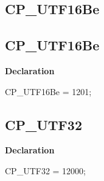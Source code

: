 \documentclass{report}
\newif\ifpdf
\begin{document}
\subsection*{\large{\textbf{CP{\_}UTF16Be}}\normalsize\hspace{1ex}\hrulefill}
\else
\subsection*{CP{\_}UTF16Be}
\fi
\label{PasDoc_Types-CP_UTF16Be}
\begin{list}{}{
\setlength{\itemindent}{0cm}
\setlength{\listparindent}{0cm}
\setlength{\leftmargin}{\evensidemargin}
\addtolength{\leftmargin}{\tmplength}
\settowidth{\labelsep}{X}
\addtolength{\leftmargin}{\labelsep}
\setlength{\labelwidth}{\tmplength}
}
\item[\textbf{Declaration}\hfill]
\ifpdf
\begin{flushleft}
\fi
\begin{ttfamily}
CP{\_}UTF16Be    = 1201;\end{ttfamily}

\ifpdf
\end{flushleft}
\fi

\end{list}
\ifpdf
\subsection*{\large{\textbf{CP{\_}UTF32}}\normalsize\hspace{1ex}\hrulefill}
\else
\subsection*{CP{\_}UTF32}
\fi
\label{PasDoc_Types-CP_UTF32}
\begin{list}{}{
\setlength{\itemindent}{0cm}
\setlength{\listparindent}{0cm}
\setlength{\leftmargin}{\evensidemargin}
\addtolength{\leftmargin}{\tmplength}
\settowidth{\labelsep}{X}
\addtolength{\leftmargin}{\labelsep}
\setlength{\labelwidth}{\tmplength}
}
\item[\textbf{Declaration}\hfill]
\ifpdf
\begin{flushleft}
\fi
\begin{ttfamily}
CP{\_}UTF32      = 12000;\end{ttfamily}

\ifpdf
\end{flushleft}
\fi

\end{list}
\ifpdf
\end{document}
